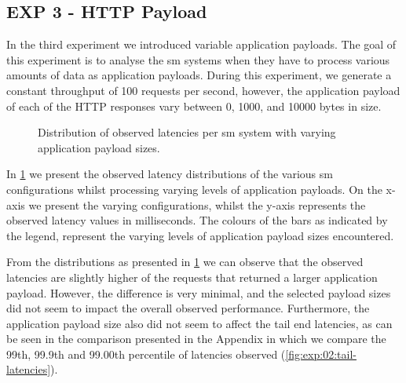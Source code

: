 \subsection{\textbf{EXP 3} - HTTP Payload}
\label{sec:experiments:results:per-experiment:03}

In the third experiment we introduced variable application payloads. The goal of this experiment is to analyse the \gls{sm} systems when they have to process various amounts of data as application payloads. During this experiment, we generate a constant throughput of 100 requests per second, however, the application payload of each of the HTTP responses vary between 0, 1000, and 10000 bytes in size. 


\begin{figure}[t]
    \centering
    

   \caption[Distribution of observed latencies per \gls{sm} system with varying application payload sizes]{Distribution of observed latencies per \gls{sm} system with varying application payload sizes.}
    
    \label{fig:exp:result:03:latency}
\end{figure}

In \cref{fig:exp:result:03:latency} we present the observed latency distributions of the various \gls{sm} configurations whilst processing varying levels of application payloads. On the x-axis we present the varying configurations, whilst the y-axis represents the observed latency values in milliseconds. The colours of the bars as indicated by the legend, represent the varying levels of application payload sizes encountered.

From the distributions as presented in \cref{fig:exp:result:03:latency} we can observe that the observed latencies are slightly higher of the requests that returned a larger application payload. However, the difference is very minimal, and the selected payload sizes did not seem to impact the overall observed performance. Furthermore, the application payload size also did not seem to affect the tail end latencies, as can be seen in the comparison presented in the Appendix in which we compare the 99th, 99.9th and 99.00th percentile of latencies observed (\cref{fig:exp:02:tail-latencies}).



